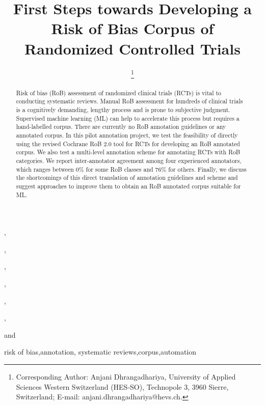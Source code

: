 \documentclass{IOS-Book-Article}
\def\hb{\hbox to 11.5 cm{}}
\begin{document}
\pagestyle{headings}
\def\thepage{}
\begin{frontmatter}              %


\title{First Steps towards Developing a Risk of Bias Corpus of Randomized Controlled Trials}

\markboth{}{April 2022\hb}

\author[A,B]{ %
\thanks{Corresponding Author: Anjani Dhrangadhariya, University of Applied Sciences Western Switzerland (HES-SO), Technopole 3,
3960 Sierre, Switzerland; E-mail:
anjani.dhrangadhariya@hevs.ch.}},
\author[C,D]{ }
,
\author[C,D]{ }
,
\author[C,D]{ }
,
\author[C,D]{ }
,
\author[C,D]{ }
,
\author[E,F]{ }
and
\author[A,B]{ }

\address[A]{Informatics Institute, HES-SO Valais-Wallis, Sierre, Switzerland}
\address[B]{University of Geneva (UNIGE), Geneva, Switzerland}
\address[C]{School of Health Sciences, HES-SO Valais-Wallis, Leukerbad, Switzerland.}
\address[D]{Department of Physiotherapy, HES-SO Valais-Wallis, Leukerbad, Switzerland.}
\address[E]{Geneva School of Business Administration, HES-SO Geneva, Switzerland.}
\address[F]{SIB Swiss Institute of Bioinformatics (SIB), Geneva, Switzerland}

\begin{abstract}
Risk of bias (RoB) assessment of randomized clinical trials (RCTs) is vital to conducting systematic reviews. 
Manual RoB assessment for hundreds of clinical trials is a cognitively demanding, lengthy process and is prone to subjective judgment. 
Supervised machine learning (ML) can help to accelerate this process but requires a hand-labelled corpus.
There are currently no RoB annotation guidelines or any annotated corpus.
In this pilot annotation project, we test the feasibility of directly using the revised Cochrane RoB 2.0 tool for RCTs for developing an RoB annotated corpus. 
We also test a multi-level annotation scheme for annotating RCTs with RoB categories.
We report inter-annotator agreement among four experienced annotators, which ranges between 0\% for some RoB classes and 76\% for others.
Finally, we discuss the shortcomings of this direct translation of annotation guidelines and scheme and suggest approaches to improve them to obtain an RoB annotated corpus suitable for ML.
\end{abstract}

\begin{keyword}
risk of bias\sep annotation\sep
systematic reviews\sep corpus\sep automation
\end{keyword}
\end{frontmatter}
\markboth{April 2022\hb}{April 2022\hb}
\end{document}
